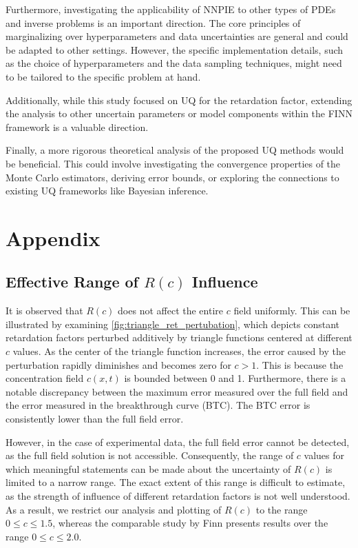 Furthermore, investigating the applicability of NNPIE to other types of PDEs and inverse problems is an important direction. The core principles of marginalizing over hyperparameters and data uncertainties are general and could be adapted to other settings. However, the specific implementation details, such as the choice of hyperparameters and the data sampling techniques, might need to be tailored to the specific problem at hand.

Additionally, while this study focused on UQ for the retardation factor, extending the analysis to other uncertain parameters or model components within the FINN framework is a valuable direction.

Finally, a more rigorous theoretical analysis of the proposed UQ methods would be beneficial. This could involve investigating the convergence properties of the Monte Carlo estimators, deriving error bounds, or exploring the connections to existing UQ frameworks like Bayesian inference.



\section*{Appendix}


\subsection*{Effective Range of $R(c)$ Influence}
It is observed that $R(c)$ does not affect the entire $c$ field uniformly. This can be illustrated by examining \cref{fig:triangle_ret_pertubation}, which depicts constant retardation factors perturbed additively by triangle functions centered at different $c$ values. As the center of the triangle function increases, the error caused by the perturbation rapidly diminishes and becomes zero for $c > 1$. This is because the concentration field $c(x,t)$ is bounded between 0 and 1. Furthermore, there is a notable discrepancy between the maximum error measured over the full field and the error measured in the breakthrough curve (BTC). The BTC error is consistently lower than the full field error.

However, in the case of experimental data, the full field error cannot be detected, as the full field solution is not accessible. Consequently, the range of $c$ values for which meaningful statements can be made about the uncertainty of $R(c)$ is limited to a narrow range. The exact extent of this range is difficult to estimate, as the strength of influence of different retardation factors is not well understood.
As a result, we restrict our analysis and plotting of $R(c)$ to the range $0 \leq c \leq 1.5$, whereas the comparable study by Finn \cite{finn} presents results over the range $0 \leq c \leq 2.0$.


